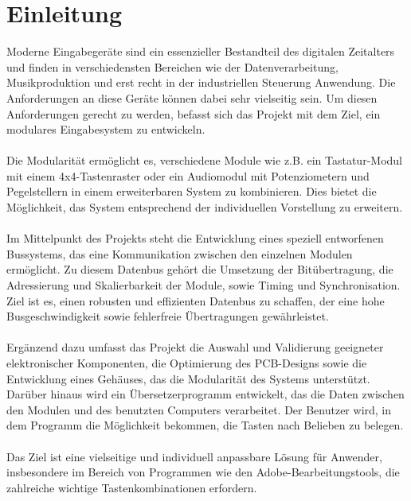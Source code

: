 \chapter{Einleitung}
Moderne Eingabegeräte sind ein essenzieller Bestandteil des digitalen Zeitalters und finden in verschiedensten Bereichen wie der Datenverarbeitung, Musikproduktion und erst recht in der industriellen Steuerung Anwendung. Die Anforderungen an diese Geräte können dabei sehr vielseitig sein. Um diesen Anforderungen gerecht zu werden, befasst sich das Projekt mit dem Ziel, ein modulares Eingabesystem zu entwickeln.
\\
\\
Die Modularität ermöglicht es, verschiedene Module wie z.B. ein Tastatur-Modul mit einem 4x4-Tastenraster oder ein Audiomodul mit Potenziometern und Pegelstellern in einem erweiterbaren System zu kombinieren. Dies bietet die Möglichkeit, das System entsprechend der individuellen Vorstellung zu erweitern.
\\
\\
Im Mittelpunkt des Projekts steht die Entwicklung eines speziell entworfenen Bussystems, das eine Kommunikation zwischen den einzelnen Modulen ermöglicht. Zu diesem Datenbus gehört die Umsetzung der Bitübertragung, die Adressierung und Skalierbarkeit der Module, sowie Timing und Synchronisation. Ziel ist es, einen robusten und effizienten Datenbus zu schaffen, der eine hohe Busgeschwindigkeit sowie fehlerfreie Übertragungen gewährleistet.
\\
\\
Ergänzend dazu umfasst das Projekt die Auswahl und Validierung geeigneter elektronischer Komponenten, die Optimierung des PCB-Designs sowie die Entwicklung eines Gehäuses, das die Modularität des Systems unterstützt. Darüber hinaus wird ein Übersetzerprogramm entwickelt, das die Daten zwischen den Modulen und des benutzten Computers verarbeitet. Der Benutzer wird, in dem Programm die Möglichkeit bekommen, die Tasten nach Belieben zu belegen.
\\
\\
Das Ziel ist eine vielseitige und individuell anpassbare Lösung für Anwender, insbesondere im Bereich von Programmen wie den Adobe-Bearbeitungstools, die zahlreiche wichtige Tastenkombinationen erfordern.
\newpage
